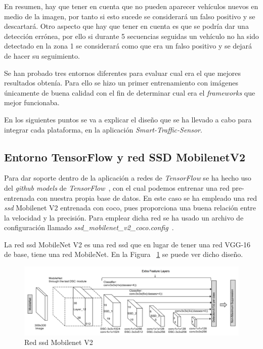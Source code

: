 En resumen, hay que tener en cuenta que no pueden aparecer vehículos nuevos en medio de la imagen, por tanto si esto sucede se considerará un falso positivo y se descartará. Otro aspecto que hay que tener en cuenta es que se podría dar una detección errónea, por ello si durante 5 secuencias seguidas un vehículo no ha sido detectado en la zona 1 se considerará como que era un falso positivo y se dejará de hacer su seguimiento.

Se han probado tres entornos diferentes para evaluar cual era el que mejores resultados obtenía. Para ello se hizo un primer entrenamiento con imágenes únicamente de buena calidad con el fin de determinar cual era el \textit{frameworks} que mejor funcionaba.


En los siguientes puntos se va a explicar el diseño que se ha llevado a cabo para integrar cada plataforma, en la aplicación \textit{Smart-Traffic-Sensor}.

\subsection{Entorno TensorFlow y red SSD MobilenetV2}\label{sub.tensorflow}

Para dar soporte dentro de la aplicación a redes de \textit{TensorFlow} se ha hecho uso del \textit{github models} de \textit{TensorFlow}~\cite{tensorflow_models}, con el cual podemos entrenar una red pre-entrenada con nuestra propia base de datos. En este caso se ha empleado una red \textit{\acrfull{ssd}} Mobilenet V2 entrenada con \acrshort{coco}, pues proporciona una buena relación entre la velocidad y la precisión. Para emplear dicha red se ha usado un archivo de configuración llamado \textit{ssd\_mobilenet\_v2\_coco.config}~\cite{ssd_mobilenetv2_config}.

La red \acrshort{ssd} MobileNet V2 es una red \acrshort{ssd} que en lugar de tener una red VGG-16 de base, tiene una red MobileNet. En la Figura ~\ref{fig.ssd_mobilenet} se puede ver dicho diseño.

\begin{figure}[H] 
\begin{center}
	\includegraphics[width=1\textwidth]{figures/Diseno_global/ssd_mobilenet.png}
   \caption{Red \acrshort{ssd} Mobilenet V2}
	\label{fig.ssd_mobilenet}
\end{center}
\end{figure}


